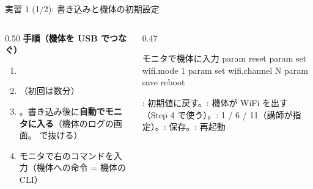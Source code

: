 \begin{frame}[fragile]{実習 1 (1/2): 書き込みと機体の初期設定}
  \begin{columns}[T]
    \begin{column}{0.50\textwidth}
      {\footnotesize\textbf{\textcolor{sfblue}{手順（機体を USB でつなぐ）}}}\par\vspace{-2pt}
      \footnotesize
      \begin{enumerate}\setlength{\itemsep}{0pt}
        \item {}
        \item {}（初回は数分）
        \item {}。書き込み後に\textbf{自動でモニタに入る}（機体のログの画面。\code{Ctrl+]} で抜ける）
        \item モニタで右のコマンドを入力（機体への命令 = 機体の CLI）
      \end{enumerate}
    \end{column}
    \begin{column}{0.47\textwidth}
      \begin{sflisting}[basicstyle=\ttfamily\scriptsize]{モニタで機体に入力}
param reset
param set wifi.mode 1
param set wifi.channel N
param save
reboot
      \end{sflisting}
      \vspace{-1mm}
      {\scriptsize {}: 初期値に戻す。: 機体が WiFi を出す（Step 4 で使う）。: 1 / 6 / 11（講師が指定）。: 保存。: 再起動\par}
    \end{column}
  \end{columns}
\end{frame}

